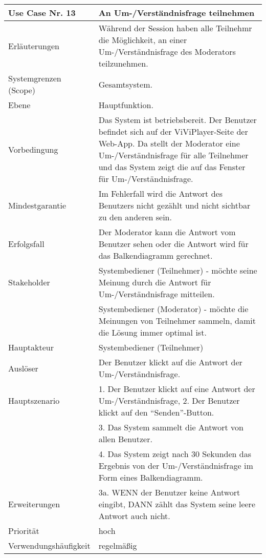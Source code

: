 \begin{tabularx}{\linewidth}{|l|X|}
	\hline
	Use Case Nr. 13			& \textbf{An Um-/Verständnisfrage teilnehmen} \\ \hline
	Erläuterungen			& Während der Session haben alle Teilnehmr die Möglichkeit, an einer 
							  Um-/Verständnisfrage des Moderators teilzunehmen. \\ \hline
	Systemgrenzen (Scope)	& Gesamtsystem. \\ \hline
	Ebene					& Hauptfunktion. \\ \hline
	Vorbedingung			& Das System ist betriebsbereit. Der Benutzer befindet sich auf der 
							  ViViPlayer-Seite der Web-App. Da stellt der Moderator eine Um-/Verständnisfrage für alle Teilnehmer und das System zeigt die auf das Fenster für Um-/Verständnisfrage. \\ \hline
	Mindestgarantie			& Im Fehlerfall wird die Antwort des Benutzers nicht gezählt und 
							  nicht sichtbar zu den anderen sein. \\ \hline
	Erfolgsfall				& Der Moderator kann die Antwort vom Benutzer sehen oder die Antwort 
							  wird für das Balkendiagramm gerechnet. \\ \hline
	Stakeholder				& Systembediener (Teilnehmer) - möchte seine Meinung durch die 
							  Antwort für Um-/Verständnisfrage mitteilen. \\ 
							& Systembediener (Moderator) - möchte die Meinungen von Teilnehmer 
							  sammeln, damit die Lösung immer optimal ist. \\ \hline
	Hauptakteur				& Systembediener (Teilnehmer) \\ \hline
	Auslöser				& Der Benutzer klickt auf die Antwort der Um-/Verständnisfrage. \\ 
							  \hline	
	Hauptszenario			& 1. Der Benutzer klickt auf eine Antwort der Um-/Verständnisfrage, 
	                          2. Der Benutzer klickt auf den ``Senden''-Button. \\
							& 3. Das System sammelt die Antwort von allen Benutzer. \\
							& 4. Das System zeigt nach 30 Sekunden das Ergebnis von der 
							  Um-/Verständnisfrage im Form eines Balkendiagramm. \\ \hline
	Erweiterungen			& 3a. WENN der Benutzer keine Antwort eingibt, DANN zählt das System 
							  seine leere Antwort auch nicht. \\ \hline
	Priorität				& hoch \\ \hline
	Verwendungshäufigkeit	& regelmäßig \\ \hline
\end{tabularx}

